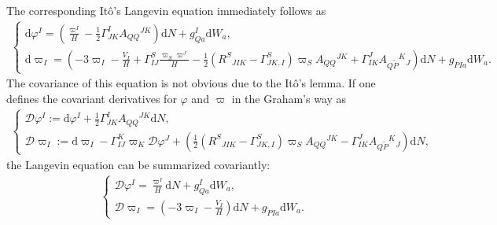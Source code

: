 \documentclass[aps, prd
, preprint
, nofootinbib 
, notitlepage
, longbibliography
]{revtex4-1}
\newcommand{\dd}{\mathrm{d}}
\newcommand{\dps}{\displaystyle}
\newcommand{\calD}{\mathcal{D}}
\newcommand{\bae}[1]{\begin{align} #1 \end{align}}
\newcommand{\bce}[1]{\begin{cases} #1 \end{cases}}
\begin{document}
The corresponding It\^o's Langevin equation immediately follows as
\bae{
	\bce{
		\dps
		\dd\varphi^I=\left(\frac{\varpi^I}{H}-\frac{1}{2}\Gamma^I_{JK}A_{QQ}{}^{JK}\right)\dd N+g^I_{Qa}\dd W_a, \\[10pt]
		\dps
		\dd\varpi_I=\left(-3\varpi_I-\frac{V_I}{H}+\Gamma^S_{IJ}\frac{\varpi_S\varpi^J}{H}
		-\frac{1}{2}\left(R^S{}_{JIK}-\Gamma^S_{JK,I}\right)\varpi_SA_{QQ}{}^{JK}+\Gamma^J_{IK}A_{Q\tilde{P}}{}^K{}_J\right)\dd N+g_{PIa}\dd W_a.
	}
}
The covariance of this equation is not obvious due to the It\^o's lemma. If one defines the covariant derivatives for $\varphi$ and $\varpi$ in the Graham's way as
\bae{
	\bce{
		\dps
		\calD\varphi^I:=\dd\varphi^I+\frac{1}{2}\Gamma^I_{JK}A_{QQ}{}^{JK}\dd N, \\[10pt]
		\dps
		\calD\varpi_I:=\dd\varpi_I-\Gamma^K_{IJ}\varpi_K\calD\varphi^J
		+\left(\frac{1}{2}\left(R^S{}_{JIK}-\Gamma^S_{JK,I}\right)\varpi_SA_{QQ}{}^{JK}-\Gamma^J_{IK}A_{Q\tilde{P}}{}^K{}_J\right)\dd N,
	}
}
the Langevin equation can be summarized covariantly:
\bae{
	\bce{
		\dps
		\calD\varphi^I=\frac{\varpi^I}{H}\dd N+g^I_{Qa}\dd W_a, \\[10pt]
		\dps
		\calD\varpi_I=\left(-3\varpi_I-\frac{V_I}{H}\right)\dd N+g_{\tilde{P}Ia}\dd W_a.
	}
}
\end{document}
